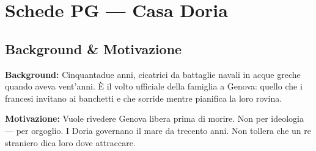 %

\chapter{Schede PG — Casa Doria}




\section*{Background \& Motivazione}

\begin{rulebox}{}
  \textbf{Background:} Cinquantadue anni, cicatrici da battaglie navali in acque greche
  quando aveva vent'anni. È il volto ufficiale della famiglia a Genova: quello che i
  francesi invitano ai banchetti e che sorride mentre pianifica la loro rovina.

  \medskip\noindent\textcolor{DoriaBlue}{\textbf{Motivazione:}} Vuole rivedere Genova
  libera prima di morire. Non per ideologia — per orgoglio. I Doria governano il mare
  da trecento anni. Non tollera che un re straniero dica loro dove attraccare.
\end{rulebox}

